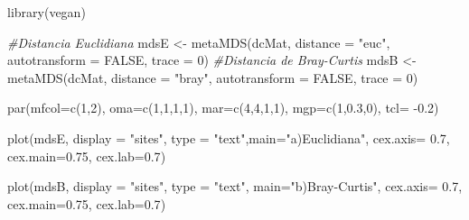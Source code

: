 \documentclass[
]{article}
\newenvironment{Shaded}{\begin{snugshade}}{\end{snugshade}}
\newcommand{\AttributeTok}[1]{\textcolor[rgb]{0.77,0.63,0.00}{#1}}
\newcommand{\CommentTok}[1]{\textcolor[rgb]{0.56,0.35,0.01}{\textit{#1}}}
\newcommand{\ConstantTok}[1]{\textcolor[rgb]{0.00,0.00,0.00}{#1}}
\newcommand{\DecValTok}[1]{\textcolor[rgb]{0.00,0.00,0.81}{#1}}
\newcommand{\FloatTok}[1]{\textcolor[rgb]{0.00,0.00,0.81}{#1}}
\newcommand{\FunctionTok}[1]{\textcolor[rgb]{0.00,0.00,0.00}{#1}}
\newcommand{\NormalTok}[1]{#1}
\newcommand{\OtherTok}[1]{\textcolor[rgb]{0.56,0.35,0.01}{#1}}
\newcommand{\SpecialCharTok}[1]{\textcolor[rgb]{0.00,0.00,0.00}{#1}}
\newcommand{\StringTok}[1]{\textcolor[rgb]{0.31,0.60,0.02}{#1}}
\begin{document}
\begin{Shaded}
\begin{Highlighting}[]
\FunctionTok{library}\NormalTok{(vegan) }

\CommentTok{\#Distancia Euclidiana}
\NormalTok{mdsE }\OtherTok{\textless{}{-}} \FunctionTok{metaMDS}\NormalTok{(dcMat, }\AttributeTok{distance =} \StringTok{"euc"}\NormalTok{, }\AttributeTok{autotransform =} \ConstantTok{FALSE}\NormalTok{, }\AttributeTok{trace =} \DecValTok{0}\NormalTok{) }
\CommentTok{\#Distancia de Bray{-}Curtis}
\NormalTok{mdsB }\OtherTok{\textless{}{-}} \FunctionTok{metaMDS}\NormalTok{(dcMat, }\AttributeTok{distance =} \StringTok{"bray"}\NormalTok{, }\AttributeTok{autotransform =} \ConstantTok{FALSE}\NormalTok{, }\AttributeTok{trace =} \DecValTok{0}\NormalTok{) }
\end{Highlighting}
\end{Shaded}

\begin{Shaded}
\begin{Highlighting}[]
\FunctionTok{par}\NormalTok{(}\AttributeTok{mfcol=}\FunctionTok{c}\NormalTok{(}\DecValTok{1}\NormalTok{,}\DecValTok{2}\NormalTok{), }\AttributeTok{oma=}\FunctionTok{c}\NormalTok{(}\DecValTok{1}\NormalTok{,}\DecValTok{1}\NormalTok{,}\DecValTok{1}\NormalTok{,}\DecValTok{1}\NormalTok{), }\AttributeTok{mar=}\FunctionTok{c}\NormalTok{(}\DecValTok{4}\NormalTok{,}\DecValTok{4}\NormalTok{,}\DecValTok{1}\NormalTok{,}\DecValTok{1}\NormalTok{),}
    \AttributeTok{mgp=}\FunctionTok{c}\NormalTok{(}\DecValTok{1}\NormalTok{,}\FloatTok{0.3}\NormalTok{,}\DecValTok{0}\NormalTok{), }\AttributeTok{tcl=} \SpecialCharTok{{-}}\FloatTok{0.2}\NormalTok{)}

\FunctionTok{plot}\NormalTok{(mdsE, }\AttributeTok{display =} \StringTok{"sites"}\NormalTok{, }
     \AttributeTok{type =} \StringTok{"text"}\NormalTok{,}\AttributeTok{main=}\StringTok{"a)Euclidiana"}\NormalTok{, }
     \AttributeTok{cex.axis=} \FloatTok{0.7}\NormalTok{, }\AttributeTok{cex.main=}\FloatTok{0.75}\NormalTok{, }\AttributeTok{cex.lab=}\FloatTok{0.7}\NormalTok{)}

\FunctionTok{plot}\NormalTok{(mdsB, }\AttributeTok{display =} \StringTok{"sites"}\NormalTok{, }\AttributeTok{type =} \StringTok{"text"}\NormalTok{, }
     \AttributeTok{main=}\StringTok{"b)Bray{-}Curtis"}\NormalTok{, }
     \AttributeTok{cex.axis=} \FloatTok{0.7}\NormalTok{, }\AttributeTok{cex.main=}\FloatTok{0.75}\NormalTok{, }\AttributeTok{cex.lab=}\FloatTok{0.7}\NormalTok{)}
\end{Highlighting}
\end{Shaded}
\end{document}
